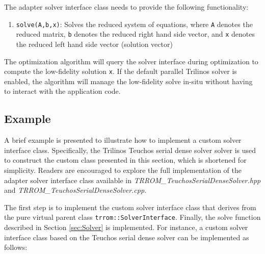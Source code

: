     The adapter solver interface class needs to provide the following functionality:
    
    \begin{enumerate}
    \item \texttt{solve(A,b,x)}: Solves the reduced system of equations, where \texttt{A} denotes the reduced matrix, \texttt{b} denotes the reduced right hand side vector, and \texttt{x} denotes the reduced left hand side vector (solution vector)
    \end{enumerate}
    
    The optimization algorithm will query the solver interface during optimization to compute the low-fidelity solution \texttt{x}. If the default parallel Trilinos solver is enabled, the algorithm will manage the low-fidelity solve in-situ without having to interact with the application code. 

    \subsection{Example}\label{subsec:SolverEx}
        
    A brief example is presented to illustrate how to implement a custom solver interface class. Specifically, the Trilinos Teuchos serial dense solver solver is used to construct the custom class presented in this section, which is shortened for simplicity. Readers are encouraged to explore the full implementation of the adapter solver interface class available in \emph{TRROM\_TeuchosSerialDenseSolver.hpp} and \emph{TRROM\_TeuchosSerialDenseSolver.cpp}.
    
    The first step is to implement the custom solver interface class that derives from the pure virtual parent class \texttt{trrom::SolverInterface}. Finally, the solve function described in Section \ref{sec:Solver} is implemented. For instance, a custom solver interface class based on the Teuchos serial dense solver can be implemented as follows:
    
